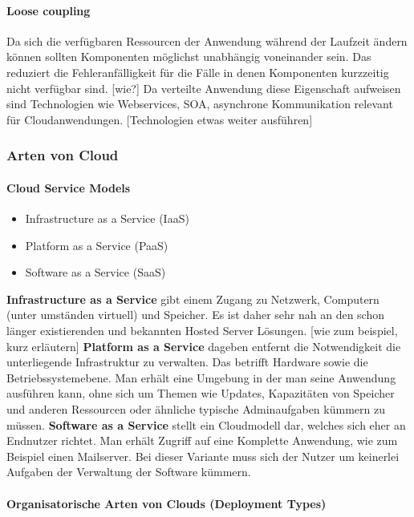 \documentclass[a4paper,10pt]{article}
\begin{document}
\paragraph{Loose coupling}
Da sich die verfügbaren Ressourcen der Anwendung während der Laufzeit ändern können sollten Komponenten möglichst unabhängig voneinander sein.
Das reduziert die Fehleranfälligkeit für die Fälle in denen Komponenten kurzzeitig nicht verfügbar sind. [wie?]
Da verteilte Anwendung diese Eigenschaft aufweisen sind Technologien wie Webservices, SOA, asynchrone Kommunikation relevant für Cloudanwendungen. [Technologien etwas weiter ausführen]

\subsubsection{Arten von Cloud}

\paragraph{Cloud Service Models}

\begin{itemize}
 \item Infrastructure as a Service (IaaS)
 \item Platform as a Service (PaaS)
 \item Software as a Service (SaaS)
\end{itemize}

\textbf{Infrastructure as a Service} gibt einem Zugang zu Netzwerk, Computern (unter umständen virtuell) und Speicher.
Es ist daher sehr nah an den schon länger existierenden und bekannten Hosted Server Lösungen. [wie zum beispiel, kurz erläutern]
\textbf{Platform as a Service} dageben entfernt die Notwendigkeit die unterliegende Infrastruktur zu verwalten.
Das betrifft Hardware sowie die Betriebssystemebene.
Man erhält eine Umgebung in der man seine Anwendung ausführen kann, ohne sich um Themen wie Updates, Kapazitäten von Speicher und anderen Ressourcen oder ähnliche typische Adminaufgaben kümmern zu müssen.
\textbf{Software as a Service} stellt ein Cloudmodell dar, welches sich eher an Endnutzer richtet.
Man erhält Zugriff auf eine Komplette Anwendung, wie zum Beispiel einen Mailserver.
Bei dieser Variante muss sich der Nutzer um keinerlei Aufgaben der Verwaltung der Software kümmern.

\paragraph{Organisatorische Arten von Clouds (Deployment Types)}
\end{document}
